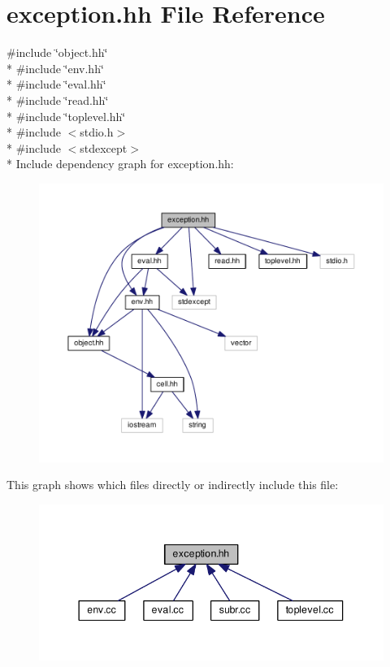 \hypertarget{exception_8hh}{\section{exception.\-hh File Reference}
\label{exception_8hh}
}
{\ttfamily \#include \char`\"{}object.\-hh\char`\"{}}\\*
{\ttfamily \#include \char`\"{}env.\-hh\char`\"{}}\\*
{\ttfamily \#include \char`\"{}eval.\-hh\char`\"{}}\\*
{\ttfamily \#include \char`\"{}read.\-hh\char`\"{}}\\*
{\ttfamily \#include \char`\"{}toplevel.\-hh\char`\"{}}\\*
{\ttfamily \#include $<$stdio.\-h$>$}\\*
{\ttfamily \#include $<$stdexcept$>$}\\*
Include dependency graph for exception.\-hh\-:\nopagebreak
\begin{figure}[H]
\begin{center}
\leavevmode
\includegraphics[width=350pt]{exception_8hh__incl}
\end{center}
\end{figure}
This graph shows which files directly or indirectly include this file\-:\nopagebreak
\begin{figure}[H]
\begin{center}
\leavevmode
\includegraphics[width=344pt]{exception_8hh__dep__incl}
\end{center}
\end{figure}
